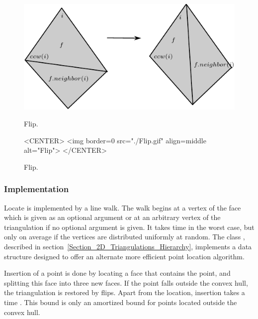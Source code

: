 \begin{figure}
\begin{ccTexOnly}
\begin{center}
\includegraphics{Triangulation_2/flip}
\end{center}
\end{ccTexOnly} 
\caption{Flip. \label{2D_Triangulation_fig_flip_bis}}
\begin{ccHtmlOnly}
<CENTER>
<img border=0 src="./Flip.gif" align=middle alt="Flip">
</CENTER>
\end{ccHtmlOnly} 

\caption{Flip. \label{2D_Triangulation_fig_flip_bis}}
\end{figure}


\subsubsection{Implementation}

Locate is implemented by a line walk. The walk
begins  at  a vertex of the face which
is given
as an optional argument  or at an arbitrary vertex of the triangulation
 if no optional argument is given. It takes
time  in the worst case, but only 
on average if the vertices are distributed uniformly at random.
The class ,
described in section~\ref{Section_2D_Triangulations_Hierarchy}, 
implements a data structure  designed to
offer an alternate  more efficient point location algorithm.

Insertion of a point is done by locating a face that contains the
point, and splitting this face into three new faces.
If the point falls outside the convex hull, the triangulation
 is restored by flips.  Apart from the location, insertion takes a
time . This bound is only an amortized bound
for points located outside the convex hull.

